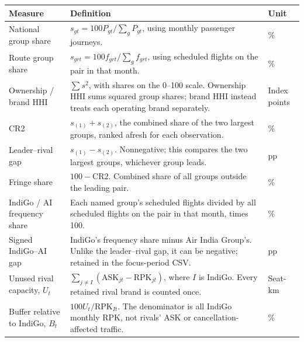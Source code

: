 \begin{minipage}{\linewidth}
\captionsetup{font=small,labelfont=bf,justification=raggedright,singlelinecheck=false,hypcap=false}
\label{tab:o4-dictionary-measures}
\centering
{\footnotesize{}\setlength{\tabcolsep}{4pt}\fontsize{10}{12}\selectfont{}\setlength{\tabcolsep}{3pt}
\renewcommand{\arraystretch}{1.15}
\begin{tabular}{|>{\raggedright\arraybackslash}p{}|>{\raggedright\arraybackslash}p{}|>{\raggedright\arraybackslash}p{}|}
\hline
\textbf{Measure} & \textbf{Definition} & \textbf{Unit} \\
\hline
National group share & $s_{gt}=100P_{gt}/\sum_gP_{gt}$, using monthly passenger journeys. & \% \\
\hline
Route group share & $s_{grt}=100f_{grt}/\sum_gf_{grt}$, using scheduled flights on the pair in that month. & \% \\
\hline
Ownership / brand HHI & $\sum s^2$, with shares on the 0--100 scale. Ownership HHI sums squared group shares; brand HHI instead treats each operating brand separately. & Index points \\
\hline
CR2 & $s_{(1)}+s_{(2)}$, the combined share of the two largest groups, ranked afresh for each observation. & \% \\
\hline
Leader--rival gap & $s_{(1)}-s_{(2)}$. Nonnegative; this compares the two largest groups, whichever group leads. & pp \\
\hline
Fringe share & $100-\mathrm{CR2}$. Combined share of all groups outside the leading pair. & \% \\
\hline
IndiGo / AI frequency share & Each named group's scheduled flights divided by all scheduled flights on the pair in that month, times 100. & \% \\
\hline
Signed IndiGo--AI gap & IndiGo's frequency share minus Air India Group's. Unlike the leader--rival gap, it can be negative; retained in the focus-period CSV. & pp \\
\hline
Unused rival capacity, $U_t$ & $\sum_{j\ne I}(\mathrm{ASK}_{jt}-\mathrm{RPK}_{jt})$, where $I$ is IndiGo. Every retained rival brand is counted once. & Seat-km \\
\hline
Buffer relative to IndiGo, $B_t$ & $100U_t/\mathrm{RPK}_{It}$. The denominator is all IndiGo monthly RPK, not rivals' ASK or cancellation-affected traffic. & \% \\

\end{tabular}}
\end{minipage}
